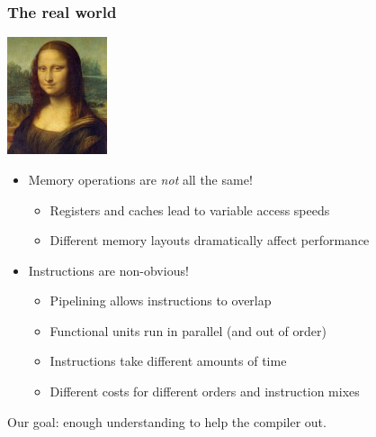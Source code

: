 \documentclass{beamer}
\begin{document}
\begin{frame}
  \frametitle{The real world}

  \begin{center}
    \includegraphics[width=0.22\textwidth]{monalisa.jpg}
  \end{center}

  \begin{itemize}
  \item Memory operations are {\em not} all the same!
    \begin{itemize}
    \item Registers and caches lead to variable access speeds
    \item Different memory layouts dramatically affect performance
    \end{itemize}
  \item Instructions are non-obvious!
    \begin{itemize}
    \item Pipelining allows instructions to overlap
    \item Functional units run in parallel (and out of order)
    \item Instructions take different amounts of time
    \item Different costs for different orders and instruction mixes
    \end{itemize}
  \end{itemize}

  Our goal: enough understanding to help the compiler out.
\end{frame}
\end{document}
